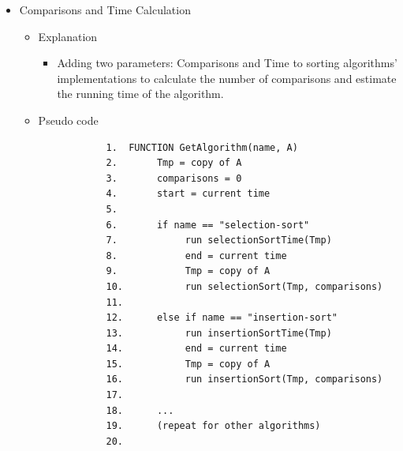 \begin{itemize}
\begin{itemize}
\begin{verbatim}
            15.           for i = 0 to n-1: A[i] = i
            16.           repeat 10 times:
            17.                swap A[random(0,n-1)], A[random(0,n-1)]
            18.
            19.      return A
            20.
            21. FUNCTION WriteFile(n, type, filename)
            22.      open file
            23.      if fail → print error, stop
            24.
            25.      write n
            26.      A = GenerateData(n, type)
            27.
            28.      for each x in A: write x
            29.
            30.      close file
            31.
            32. FUNCTION WriteArray(filename, A)
            33.      open file
            34.      if success:
            35.           write size(A)
            36.           for i = 0 to size(A)-1:
            37.                write A[i]
            38.                if not last → write space
            39.           close file
            40.      else:
            41.           print error
        \end{verbatim}
    \end{itemize}
    \item Comparisons and Time Calculation
    \begin{itemize}
        \item Explanation
        \begin{itemize}
            \item Adding two parameters: Comparisons and Time to sorting algorithms' implementations to calculate the number of comparisons and estimate the running time of the algorithm.
        \end{itemize}
        \item Pseudo code
        \begin{verbatim}
            1.  FUNCTION GetAlgorithm(name, A)
            2.       Tmp = copy of A
            3.       comparisons = 0
            4.       start = current time
            5.
            6.       if name == "selection-sort"
            7.            run selectionSortTime(Tmp)
            8.            end = current time
            9.            Tmp = copy of A
            10.           run selectionSort(Tmp, comparisons)
            11.
            12.      else if name == "insertion-sort"
            13.           run insertionSortTime(Tmp)
            14.           end = current time
            15.           Tmp = copy of A
            16.           run insertionSort(Tmp, comparisons)
            17.
            18.      ...
            19.      (repeat for other algorithms)
            20.

\end{verbatim}
\end{itemize}
\end{itemize}
